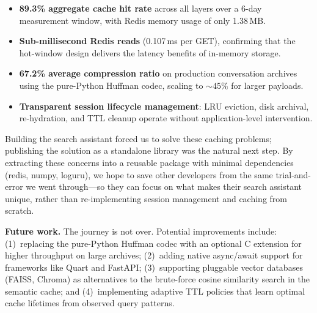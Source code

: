 \documentclass[conference]{IEEEtran}
\begin{document}
\begin{itemize}
\item \textbf{89.3\% aggregate cache hit rate} across all layers over a 6-day measurement window, with Redis memory usage of only 1.38\,MB.
\item \textbf{Sub-millisecond Redis reads} (0.107\,ms per GET), confirming that the hot-window design delivers the latency benefits of in-memory storage.
\item \textbf{67.2\% average compression ratio} on production conversation archives using the pure-Python Huffman codec, scaling to ${\sim}45\%$ for larger payloads.
\item \textbf{Transparent session lifecycle management}: LRU eviction, disk archival, re-hydration, and TTL cleanup operate without application-level intervention.
\end{itemize}

Building the search assistant forced us to solve these caching problems; publishing the solution as a standalone library was the natural next step. By extracting these concerns into a reusable package with minimal dependencies (redis, numpy, loguru), we hope to save other developers from the same trial-and-error we went through---so they can focus on what makes their search assistant unique, rather than re-implementing session management and caching from scratch.

\textbf{Future work.} The journey is not over. Potential improvements include: (1)~replacing the pure-Python Huffman codec with an optional C extension for higher throughput on large archives; (2)~adding native async/await support for frameworks like Quart and FastAPI; (3)~supporting pluggable vector databases (FAISS, Chroma) as alternatives to the brute-force cosine similarity search in the semantic cache; and (4)~implementing adaptive TTL policies that learn optimal cache lifetimes from observed query patterns.
\end{document}
